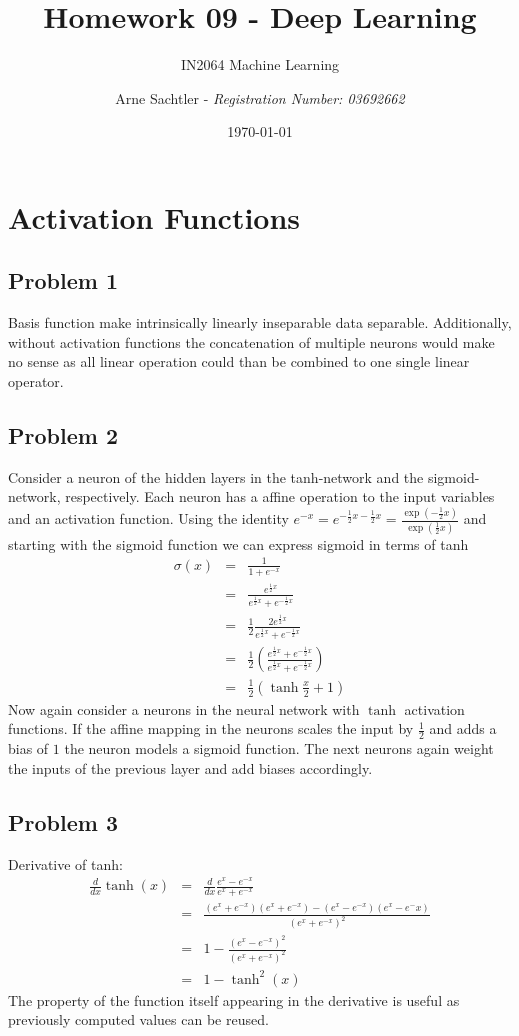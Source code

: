 \documentclass{scrartcl}
\title{Homework 09 - Deep Learning}
\author{Arne Sachtler - \textit{Registration Number: 03692662}}
\date{\today}
\subtitle{IN2064 Machine Learning}
\begin{document}
\maketitle
\section{Activation Functions}
\subsection{Problem 1}
Basis function make intrinsically linearly inseparable data separable.
Additionally, without activation functions the concatenation of multiple neurons would make no sense as all linear operation could than be combined to one single linear operator.

\subsection{Problem 2}
Consider a neuron of the hidden layers in the tanh-network and the sigmoid-network, respectively.
Each neuron has a affine operation to the input variables and an activation function.
Using the identity $e^{-x} = e^{-\frac{1}{2}x - \frac{1}{2}x} = \frac{\exp(-\frac{1}{2}x)}{\exp(\frac{1}{2}x)}$ and starting with the sigmoid function we can express sigmoid in terms of tanh
\begin{eqnarray}
	\sigma(x) &=& \frac{1}{1+e^{-x}}\\
	&=& \frac{e^{\frac{1}{2}x}}{e^{\frac{1}{2}x} + e^{-\frac{1}{2}x}}\\
	&=& \frac{1}{2}\frac{2e^{\frac{1}{2}x}}{e^{\frac{1}{2}x} + e^{-\frac{1}{2}x}}\\
	&=& \frac{1}{2}\left(\frac{e^{\frac{1}{2}x} + e^{-\frac{1}{2}x}}{e^{\frac{1}{2}x} + e^{-\frac{1}{2}x}}\right)\\
	&=& \frac{1}{2}\left(\tanh \frac{x}{2} + 1\right)
\end{eqnarray}
Now again consider a neurons in the neural network with $\tanh$ activation functions. 
If the affine mapping in the neurons scales the input by $\frac{1}{2}$ and adds a bias of $1$ the neuron models a sigmoid function. The next neurons again weight the inputs of the previous layer and add biases accordingly.

\subsection{Problem 3}
Derivative of tanh:
\begin{eqnarray}
	\frac{d}{dx}\tanh (x) &=& \frac{d}{dx} \frac{e^x - e^{-x}}{e^x + e^{-x}}\\
	&=& \frac{(e^x + e^{-x})(e^x + e^{-x}) - (e^x - e^{-x})(e^x - e^-x)}{(e^x + e^{-x})^2}\\
	&=& 1 - \frac{(e^x - e^{-x})^2}{(e^x + e^{-x})^2}\\
	&=& 1 - \tanh^2(x)
\end{eqnarray}
The property of the function itself appearing in the derivative is useful as previously computed values can be reused.
\end{document}
